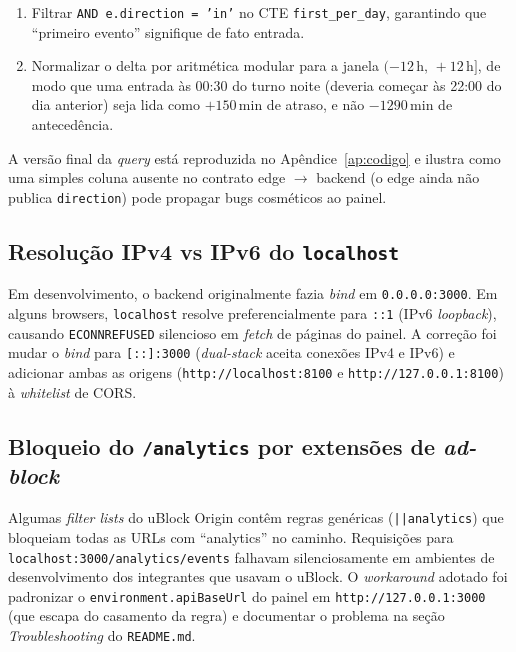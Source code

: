 \documentclass[12pt,a4paper]{report}
\begin{document}
\begin{enumerate}
    \item Filtrar \texttt{AND e.direction = 'in'} no CTE
        \texttt{first\_per\_day}, garantindo que ``primeiro evento''
        signifique de fato entrada.
    \item Normalizar o delta por aritmética modular para a janela
        $(-12\,\mathrm{h},\,+12\,\mathrm{h}]$, de modo que uma entrada
        às 00:30 do turno noite (deveria começar às 22:00 do dia
        anterior) seja lida como $+150\,$min de atraso, e não
        $-1290\,$min de antecedência.
\end{enumerate}

A versão final da \textit{query} está reproduzida no
Apêndice~\ref{ap:codigo} e ilustra como uma simples coluna ausente no
contrato edge $\rightarrow$ backend (o edge ainda não publica
\texttt{direction}) pode propagar bugs cosméticos ao painel.

\subsection{Resolução IPv4 vs IPv6 do \texttt{localhost}}

Em desenvolvimento, o backend originalmente fazia \textit{bind} em
\texttt{0.0.0.0:3000}. Em alguns browsers, \texttt{localhost} resolve
preferencialmente para \texttt{::1} (IPv6 \textit{loopback}), causando
\texttt{ECONNREFUSED} silencioso em \textit{fetch} de páginas do
painel. A correção foi mudar o \textit{bind} para
\texttt{[::]:3000} (\textit{dual-stack} aceita conexões IPv4 e IPv6)
e adicionar ambas as origens (\texttt{http://localhost:8100} e
\texttt{http://127.0.0.1:8100}) à \textit{whitelist} de CORS.

\subsection{Bloqueio do \texttt{/analytics} por extensões de
\textit{ad-block}}

Algumas \textit{filter lists} do uBlock Origin contêm regras
genéricas (\texttt{||analytics}) que bloqueiam todas as URLs com
``analytics'' no caminho. Requisições para
\texttt{localhost:3000/analytics/events} falhavam silenciosamente em
ambientes de desenvolvimento dos integrantes que usavam o uBlock. O
\textit{workaround} adotado foi padronizar o
\texttt{environment.apiBaseUrl} do painel em
\texttt{http://127.0.0.1:3000} (que escapa do casamento da regra) e
documentar o problema na seção \textit{Troubleshooting} do
\texttt{README.md}.
\end{document}
